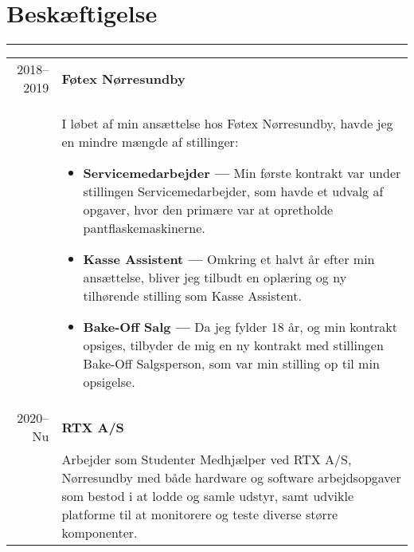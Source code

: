 \documentclass{article}
\begin{document}
\section*{Beskæftigelse}
\hrule width5cm
\begin{longtabu} to \textwidth {r|X}
2018--2019 & \textbf{Føtex Nørresundby}\\
&   I løbet af min ansættelse hos Føtex Nørresundby, havde jeg en mindre mængde af stillinger:
    \begin{itemize}\setlength\itemsep{0em}
        \item[] \textbf{Servicemedarbejder --- } Min første kontrakt var under stillingen 
            Servicemedarbejder, som havde et udvalg af opgaver, hvor den primære var at
            opretholde pantflaskemaskinerne.
        \item[] \textbf{Kasse Assistent --- } Omkring et halvt år efter min ansættelse, bliver
            jeg tilbudt en oplæring og ny tilhørende stilling som Kasse Assistent.
        \item[] \textbf{Bake-Off Salg --- } Da jeg fylder 18 år, og min kontrakt opsiges,
            tilbyder de mig en ny kontrakt med stillingen Bake-Off Salgsperson, som var min stilling
            op til min opsigelse.
    \end{itemize} \\
2020--Nu & \textbf{RTX A/S}\\
&   Arbejder som Studenter Medhjælper ved RTX A/S, Nørresundby med både hardware og software
    arbejdsopgaver som bestod i at lodde og samle udstyr, samt udvikle platforme til at
    monitorere og teste diverse større komponenter. 
\end{longtabu}
\end{document}

